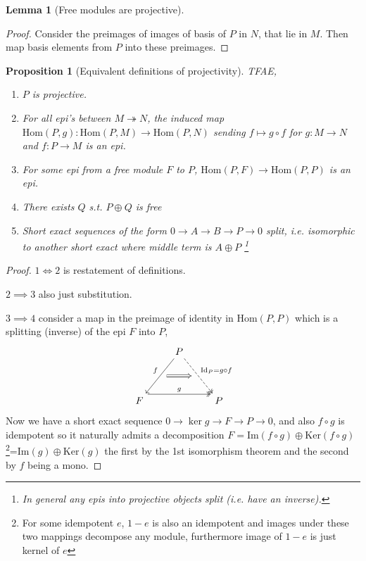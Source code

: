 \documentclass[12pt]{article}
\numberwithin{equation}{section}
\newcommand{\Hom}{{\mathrm{Hom}}}
\newcommand{\image}{{\mathrm{Im}}}
\newcommand{\kernel}{{\mathrm{Ker}}}
\newcounter{dummy} \numberwithin{dummy}{section}
\newtheorem{lemma}[dummy]{Lemma}
\newtheorem{proposition}[dummy]{Proposition}
\begin{document}
\begin{appendices}
	\begin{lemma}[Free modules are projective]
	\end{lemma}
	\begin{proof}
		Consider the preimages of images of basis of $P$ in $N$, that lie in $M$. Then map basis elements from $P$ into these preimages.
	\end{proof}
	\begin{proposition}[Equivalent definitions of projectivity]\label{projtfae}
		TFAE,
		\begin{enumerate}
			\item $P$ is projective.
			\item For all epi's between $M\twoheadrightarrow N$, the induced map $\Hom(P,g):\mathrm{Hom}(P,M) \to \mathrm{Hom}(P,N)$ sending $f \mapsto g \circ f$ for $g:M \to N$ and $f:P \to M$ is an epi.
			\item For some epi from a free module $F$ to $P$, $\mathrm{Hom}(P,F) \to \mathrm{Hom}(P,P)$ is an epi.
			\item There exists $Q$ s.t. $P \oplus Q$ is free
			\item Short exact sequences of the form $0 \to A \to B \to P \to 0$ split, i.e. isomorphic to another short exact where middle term is $A \oplus P$ \footnote{In general any epis into projective objects split (i.e. have an inverse).}
		\end{enumerate}
	\end{proposition}
	\begin{proof}
		$1 \iff 2$ is restatement of definitions.
		
		$2 \implies 3$ also just substitution.
		
		$3 \implies 4$ consider a map in the preimage of identity in $\Hom(P,P)$ which is a splitting (inverse) of the epi $F$ into $P$,
		\[\begin{tikzcd}
			& P \\
			\\
			F && P
			\arrow["g", shift left=3, two heads, from=3-1, to=3-3]
			\arrow[""{name=0, anchor=center, inner sep=0}, "f"', from=1-2, to=3-1]
			\arrow[""{name=1, anchor=center, inner sep=0}, "{\mathrm{Id}_P=g \circ f}", dashed, two heads, from=1-2, to=3-3]
			\arrow[shorten <=6pt, shorten >=6pt, Rightarrow, from=0, to=1]
		\end{tikzcd}\]
		Now we have a short exact sequence $0 \to \ker g \to F \to P \to 0$, and also $f\circ g $ is idempotent so it naturally admits a decomposition $F = \image(f \circ g) \oplus \kernel (f \circ g)$\footnote{For some idempotent $e$, $1-e$ is also an idempotent and images under these two mappings decompose any module, furthermore image of $1-e$ is just kernel of $e$}=$\image (g) \oplus \kernel (g)$ the first by the 1st isomorphism theorem and the second by $f $ being a mono.
		

\end{proof}
\end{appendices}
\end{document}
